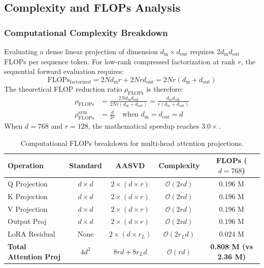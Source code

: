\subsection{Complexity and FLOPs Analysis}
\subsubsection{Computational Complexity Breakdown}
Evaluating a dense linear projection of dimension $d_{\text{in}} \times d_{\text{out}}$ requires $2 d_{\text{in}} d_{\text{out}}$ FLOPs per sequence token. For low-rank compressed factorization at rank $r$, the sequential forward evaluation requires:
\[
\text{FLOPs}_{\text{factorized}} = 2 N d_{\text{in}} r + 2 N r d_{\text{out}} = 2 N r (d_{\text{in}} + d_{\text{out}})
\]
The theoretical FLOP reduction ratio $\rho_{\text{FLOPs}}$ is therefore:
\begin{align}
\rho_{\text{FLOPs}} &= \frac{2 N d_{\text{in}} d_{\text{out}}}{2 N r (d_{\text{in}} + d_{\text{out}})} = \frac{d_{\text{in}} d_{\text{out}}}{r (d_{\text{in}} + d_{\text{out}})} \\
\rho_{\text{FLOPs}}^{\text{sym}} &= \frac{d}{2 r} \quad \text{when } d_{\text{in}} = d_{\text{out}} = d
\end{align}
When $d = 768$ and $r = 128$, the mathematical speedup reaches $3.0\times$.

\begin{table}[H]
\centering
\small
\begin{tabular}{lcccc}
\toprule
\textbf{Operation} & \textbf{Standard} & \textbf{AASVD} & \textbf{Complexity} & \textbf{FLOPs ($d=768$)} \\
\midrule
Q Projection & $d \times d$ & $2 \times (d \times r)$ & $\mathcal{O}(2rd)$ & $0.196$ M \\
K Projection & $d \times d$ & $2 \times (d \times r)$ & $\mathcal{O}(2rd)$ & $0.196$ M \\
V Projection & $d \times d$ & $2 \times (d \times r)$ & $\mathcal{O}(2rd)$ & $0.196$ M \\
Output Proj & $d \times d$ & $2 \times (d \times r)$ & $\mathcal{O}(2rd)$ & $0.196$ M \\
LoRA Residual & None & $2 \times (d \times r_L)$ & $\mathcal{O}(2r_L d)$ & $0.024$ M \\
\midrule
\textbf{Total Attention Proj} & $4 d^2$ & $8rd + 8r_L d$ & $\mathcal{O}(rd)$ & \textbf{0.808 M (vs 2.36 M)} \\
\bottomrule
\end{tabular}
\caption{Computational FLOPs breakdown for multi-head attention projections.}
\end{table}

